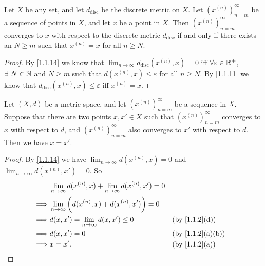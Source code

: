 \begin{prop}\label{1.1.19}
  Let \(X\) be any set, and let \(d_{\text{disc}}\) be the discrete metric on \(X\).
  Let \((x^{(n)})_{n = m}^\infty\) be a sequence of points in \(X\), and let \(x\) be a point in \(X\).
  Then \((x^{(n)})_{n = m}^\infty\) converges to \(x\) with respect to the discrete metric \(d_{\text{disc}}\) if and only if there exists an \(N \geq m\) such that \(x^{(n)} = x\) for all \(n \geq N\).
\end{prop}

\begin{proof}
  By \cref{1.1.14} we know that \(\lim_{n \to \infty} d_{\text{disc}}(x^{(n)}, x) = 0\) iff \(\forall \varepsilon \in \mathbb{R}^+\), \(\exists\ N \in \mathbb{N}\) and \(N \geq m\) such that \(d(x^{(n)}, x) \leq \varepsilon\) for all \(n \geq N\).
  By \cref{1.1.11} we know that \(d_{\text{disc}}(x^{(n)}, x) \leq \varepsilon\) iff \(x^{(n)} = x\).
\end{proof}

\begin{prop}\label{1.1.20}
  Let \((X, d)\) be a metric space, and let \((x^{(n)})_{n = m}^\infty\) be a sequence in \(X\).
  Suppose that there are two points \(x, x' \in X\) such that \((x^{(n)})_{n = m}^\infty\) converges to \(x\) with respect to \(d\), and \((x^{(n)})_{n = m}^\infty\) also converges to \(x'\) with respect to \(d\).
  Then we have \(x = x'\).
\end{prop}

\begin{proof}
  By \cref{1.1.14} we have \(\lim_{n \to \infty} d(x^{(n)}, x) = 0\) and \(\lim_{n \to \infty} d(x^{(n)}, x') = 0\).
  So
  \begin{align*}
             & \lim_{n \to \infty} d(x^{(n)}, x) + \lim_{n \to \infty} d(x^{(n)}, x') = 0                                     \\
    \implies & \lim_{n \to \infty} \bigg(d(x^{(n)}, x) + d(x^{(n)}, x')\bigg) = 0                                             \\
    \implies & d(x, x') = \lim_{n \to \infty} d(x, x') \leq 0                             &  & \text{(by \cref{1.1.2}(d))}    \\
    \implies & d(x, x') = 0                                                               &  & \text{(by \cref{1.1.2}(a)(b))} \\
    \implies & x = x'.                                                                    &  & \text{(by \cref{1.1.2}(a))}
  \end{align*}
\end{proof}

